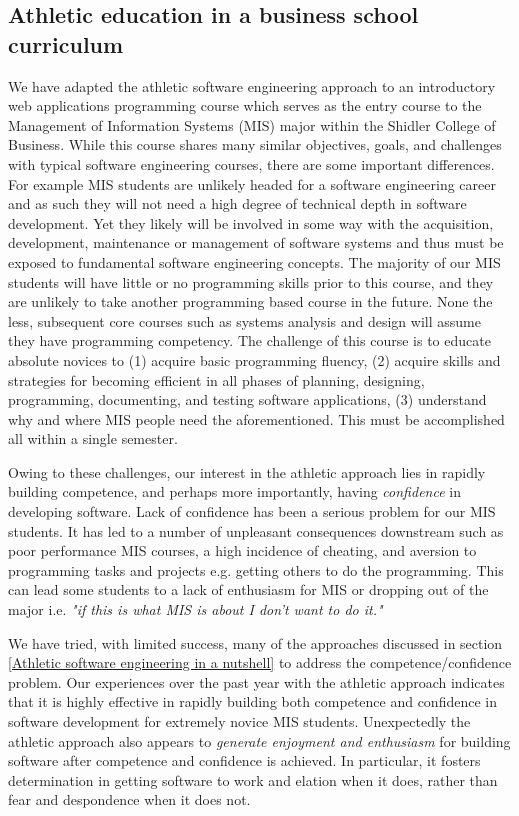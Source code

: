 \subsection{Athletic education in a business school curriculum}
We have adapted the athletic software engineering approach to an introductory web applications programming course which serves as the entry course to the Management of Information Systems (MIS) major within the Shidler College of Business. While this course shares many similar objectives, goals, and challenges with typical software engineering courses, there are some important differences. For example MIS students are unlikely headed for a software engineering career and as such they will not need a high degree of technical depth in software development. Yet they likely will be involved in some way with the acquisition, development, maintenance or management of software systems and thus must be exposed to fundamental software engineering concepts. The majority of our MIS students will have little or no programming skills prior to this course, and they are unlikely to take another programming based course in the future. None the less, subsequent core courses such as systems analysis and design will assume they have programming competency. The challenge of this course is to educate absolute novices to (1) acquire basic programming fluency, (2) acquire skills and strategies for becoming efficient in all phases of planning, designing, programming, documenting, and testing software applications, (3) understand why and where MIS people need the aforementioned. This must be accomplished all within a single semester. 

Owing to these challenges, our interest in the athletic approach lies in rapidly building competence, and perhaps more importantly, having {\em confidence} in developing software. Lack of confidence has been a serious problem for our MIS students. It has led to a number of unpleasant consequences downstream such as poor performance MIS courses, a high incidence of cheating, and aversion to programming tasks and projects e.g. getting others to do the programming. This can lead some students to a lack of enthusiasm for MIS or dropping out of the major i.e. {\em "if this is what MIS is about I don't want to do it."} 

We have tried, with limited success, many of the approaches discussed in section \ref{Athletic software engineering in a nutshell} to address the competence/confidence  problem. Our experiences over the past year with the athletic approach indicates that it is highly effective in rapidly building both competence and confidence in software development for extremely novice MIS students. Unexpectedly the athletic approach also appears to {\em generate enjoyment and enthusiasm} for building software after competence and confidence is achieved. In particular, it fosters determination in getting software to work and elation when it does, rather than fear and despondence when it does not.

